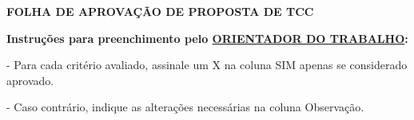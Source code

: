 \documentclass{ufsc-thesis}
\begin{document}
\begin{center}
  \Large \textbf{FOLHA DE APROVAÇÃO DE PROPOSTA DE TCC}\\[5px]

\begin{flushleft}
\end{flushleft}
{
\small
\begin{flushleft}
\quad \textbf{Instruções para preenchimento pelo \underline{ORIENTADOR DO TRABALHO}:}

\qquad - Para cada critério avaliado, assinale um X na coluna SIM apenas se considerado aprovado.

\qquad - Caso contrário, indique as alterações necessárias na coluna Observação.
\end{flushleft}
}


\end{center}
\end{document}
